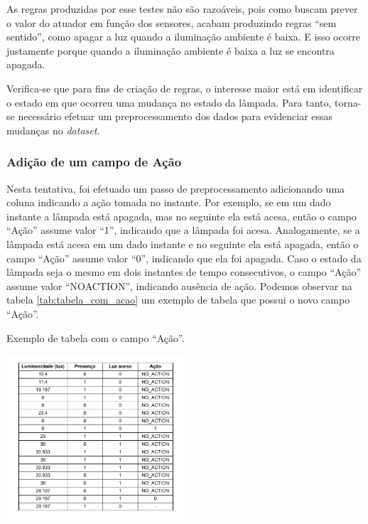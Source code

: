 As regras produzidas por esse testes não são razoáveis, pois como buscam prever o valor do atuador em função dos sensores, acabam produzindo regras ``sem sentido'', como apagar a luz quando a iluminação ambiente é baixa. E isso ocorre justamente porque quando a iluminação ambiente é baixa a luz se encontra apagada.

Verifica-se que para fins de criação de regras, o interesse maior está em identificar o estado em que ocorreu uma mudança no estado da lâmpada. Para tanto, torna-se necessário efetuar um preprocessamento dos dados para evidenciar essas mudanças no \textit{dataset}.

\clearpage

\subsubsection{Adição de um campo de Ação}
\label{subsubsec:action_add}
Nesta tentativa, foi efetuado um passo de preprocessamento adicionando uma coluna indicando a ação tomada no instante. Por exemplo, se em um dado instante a lâmpada está apagada, mas no seguinte ela está acesa, então o campo ``Ação'' assume valor ``1'', indicando que a lâmpada foi acesa. Analogamente, se a lâmpada está acesa em um dado instante e no seguinte ela está apagada, então o campo ``Ação'' assume valor ``0'', indicando que ela foi apagada. Caso o estado da lâmpada seja o mesmo em dois instantes de tempo consecutivos, o campo ``Ação'' assume valor ``NO\underline{\space}ACTION'', indicando ausência de ação. Podemos observar na tabela \ref{tab:tabela_com_acao} um exemplo de tabela que possui o novo campo ``Ação''.


\begin{table}[h]
	\centering
	\caption{Exemplo de tabela com o campo ``Ação''.}\smallskip
	\label{tab:tabela_com_acao}
	\includegraphics[width=0.5\textwidth]{tabelas/table_with_action.pdf}
\end{table}

